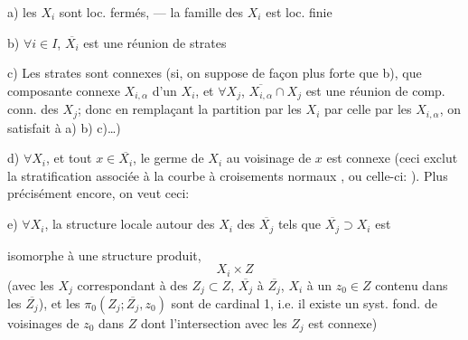 a) les $X_i$ sont loc. fermés, --- la famille des $X_i$ est loc. finie

b) $\forall i\in I$, $\overline{X_i}$ est une réunion de strates

c) Les strates sont  connexes (si, on suppose de façon plus forte que b), que    composante connexe  $X_{i,\alpha}$ d'un $X_i$, et $\forall X_j$, $\overline{X_{i,\alpha}}\cap X_j$ est une réunion de comp. conn. des $X_j$; donc en remplaçant la partition par les $X_i$ par celle par les $X_{i,\alpha}$, on satisfait à a) b) c)\ldots)

d)  $\forall X_i$, et tout $x\in\overline{X_i}$, le germe  de $X_i$ au voisinage de $x$ est connexe (ceci exclut la stratification associée à la courbe à croisements normaux
,
ou celle-ci:
).
Plus précisément encore, on veut ceci:

e) $\forall X_i$, la structure locale autour des $X_i$  des $\overline{X_j}$ tels que $\overline{X_j}\supset X_i$ est 



isomorphe à une structure produit,
\[
X_i\times Z
\]
(avec les $X_j$ correspondant à des $Z_j\subset Z$, $\overline{X_j}$ à $\overline{Z_j}$, $X_i$ à un $z_0\in Z$ contenu dans les $\overline{Z_j}$), et les $\pi_0(Z_j;\overline{Z_j},z_0)$ sont de cardinal 1, i.e. il existe  un syst. fond. de voisinages de $z_0$ dans $Z$ dont l'intersection avec les $Z_j$ est connexe)

